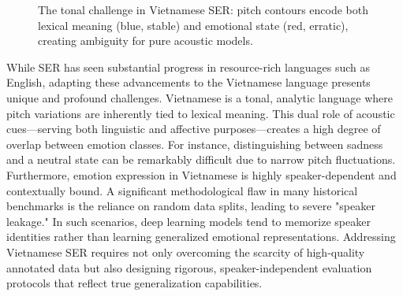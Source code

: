 \documentclass[12pt,a4paper]{report}
\begin{document}
\begin{figure}[h]
\centering
{}
\caption{The tonal challenge in Vietnamese SER: pitch contours encode both lexical meaning (blue, stable) and emotional state (red, erratic), creating ambiguity for pure acoustic models.}
\label{fig:tonal_challenge}
\end{figure}

While SER has seen substantial progress in resource-rich languages such as English, adapting these advancements to the Vietnamese language presents unique and profound challenges. Vietnamese is a tonal, analytic language where pitch variations are inherently tied to lexical meaning. This dual role of acoustic cues—serving both linguistic and affective purposes—creates a high degree of overlap between emotion classes. For instance, distinguishing between sadness and a neutral state can be remarkably difficult due to narrow pitch fluctuations. Furthermore, emotion expression in Vietnamese is highly speaker-dependent and contextually bound. A significant methodological flaw in many historical benchmarks is the reliance on random data splits, leading to severe "speaker leakage." In such scenarios, deep learning models tend to memorize speaker identities rather than learning generalized emotional representations. Addressing Vietnamese SER requires not only overcoming the scarcity of high-quality annotated data but also designing rigorous, speaker-independent evaluation protocols that reflect true generalization capabilities.
\end{document}
